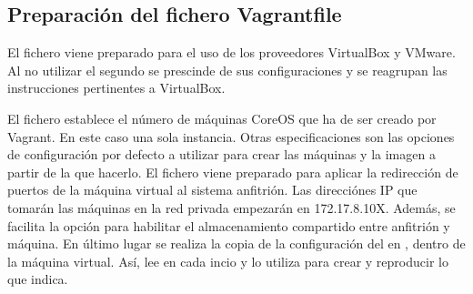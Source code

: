 \begin{codelisting}
\label{code:cloud-config1}
\end{codelisting}

\subsection{Preparación del fichero Vagrantfile}

El fichero viene preparado para el uso de los proveedores VirtualBox y VMware. Al no utilizar el segundo se prescinde de sus configuraciones y se reagrupan las instrucciones pertinentes a VirtualBox.

El fichero  establece el número de máquinas CoreOS que ha de ser creado por Vagrant. En este caso una sola instancia. Otras especificaciones son las opciones de configuración por defecto a utilizar para crear las máquinas y la imagen a partir de la que hacerlo. El fichero viene preparado para aplicar la redirección de puertos de la máquina virtual al sistema anfitrión. Las direcciónes IP que tomarán las máquinas en la red privada empezarán en 172.17.8.10X. Además, se facilita la opción para habilitar el almacenamiento compartido entre anfitrión y máquina. En último lugar se realiza la copia de la configuración del  en , dentro de la máquina virtual. Así,  lee  en cada incio y lo utiliza para crear y reproducir lo que indica.

